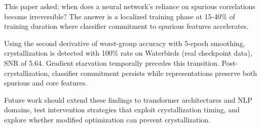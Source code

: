 
This paper asked: when does a neural network's reliance on spurious correlations become irreversible? The answer is a localized training phase at 15-40\% of training duration where classifier commitment to spurious features accelerates.

Using the second derivative of worst-group accuracy with 5-epoch smoothing, crystallization is detected with 100\% rate on Waterbirds (real checkpoint data), SNR of 5.64. Gradient starvation temporally precedes this transition. Post-crystallization, classifier commitment persists while representations preserve both spurious and core features.

Future work should extend these findings to transformer architectures and NLP domains, test intervention strategies that exploit crystallization timing, and explore whether modified optimization can prevent crystallization.

